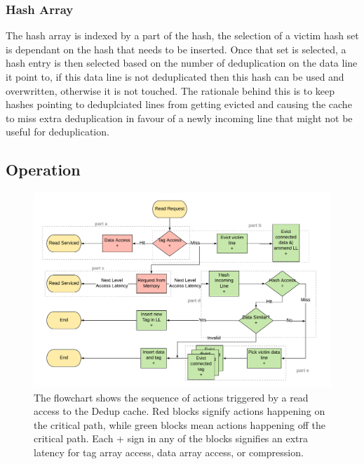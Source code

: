 \subsubsection{Hash Array}
\label{sssec:DedupHashRepl}
The hash array is indexed by a part of the hash, the selection of a victim hash set is dependant on the hash that needs to be inserted. Once that set is selected, a hash entry is then selected based on the number of deduplication on the data line it point to, if this data line is not deduplicated then this hash can be used and overwritten, otherwise it is not touched. The rationale behind this is to keep hashes pointing to deduplciated lines from getting evicted and causing the cache to miss extra deduplication in favour of a newly incoming line that might not be useful for deduplication.\par

\subsection{Operation}
\label{ssec:DedupOperations}
\begin{figure}[h]
    \includegraphics[width=\textwidth]{Dedup_Read.pdf}
    \caption[Dedup Read]{The flowchart shows the sequence of actions triggered by a read access to the Dedup cache. Red blocks signify actions happening on the critical path, while green blocks mean actions happening off the critical path. Each + sign in any of the blocks signifies an extra latency for tag array access, data array access, or compression.}
    \label{fig:Dedup_Read}
\end{figure}
